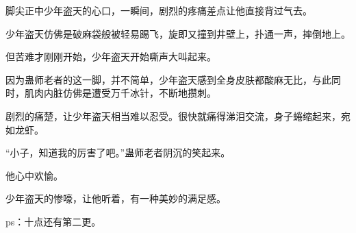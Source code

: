 \begin{this_body}
脚尖正中少年盗天的心口，一瞬间，剧烈的疼痛差点让他直接背过气去。

少年盗天仿佛是破麻袋般被轻易踢飞，旋即又撞到井壁上，扑通一声，摔倒地上。

但苦难才刚刚开始，少年盗天开始嘶声大叫起来。

因为蛊师老者的这一脚，并不简单，少年盗天感到全身皮肤都酸麻无比，与此同时，肌肉内脏仿佛是遭受万千冰针，不断地攒刺。

剧烈的痛楚，让少年盗天相当难以忍受。很快就痛得涕泪交流，身子蜷缩起来，宛如龙虾。

“小子，知道我的厉害了吧。”蛊师老者阴沉的笑起来。

他心中欢愉。

少年盗天的惨嚎，让他听着，有一种美妙的满足感。

ps：十点还有第二更。

\end{this_body}


